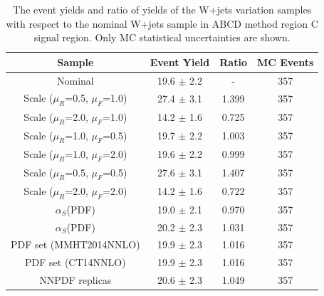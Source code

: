 \begin{table}[htbp!]
\begin{center}
\begin{tabular}{c|c|c||c}
Sample     & Event Yield & Ratio & MC Events \\ 
\hline
Nominal                              & 19.6 $\pm$ 2.2  & -      &  357 \\
Scale ($\mu_{R}$=0.5, $\mu_{F}$=1.0) & 27.4 $\pm$ 3.1  & 1.399  &  357 \\
Scale ($\mu_{R}$=2.0, $\mu_{F}$=1.0) & 14.2 $\pm$ 1.6  & 0.725  &  357 \\
Scale ($\mu_{R}$=1.0, $\mu_{F}$=0.5) & 19.7 $\pm$ 2.2  & 1.003  &  357 \\
Scale ($\mu_{R}$=1.0, $\mu_{F}$=2.0) & 19.6 $\pm$ 2.2  & 0.999  &  357 \\
Scale ($\mu_{R}$=0.5, $\mu_{F}$=0.5) & 27.6 $\pm$ 3.1  & 1.407  &  357 \\
Scale ($\mu_{R}$=2.0, $\mu_{F}$=2.0) & 14.2 $\pm$ 1.6  & 0.722  &  357 \\
$\alpha_{S}$(PDF)                    & 19.0 $\pm$ 2.1  & 0.970  &  357 \\
$\alpha_{S}$(PDF)                    & 20.2 $\pm$ 2.3  & 1.031  &  357 \\
PDF set (MMHT2014NNLO)               & 19.9 $\pm$ 2.3  & 1.016  &  357 \\
PDF set (CT14NNLO)                   & 19.9 $\pm$ 2.3  & 1.016  &  357 \\
NNPDF replicas                       & 20.6 $\pm$ 2.3  & 1.049  &  357 \\
\end{tabular}
\end{center}
\caption{The event yields and ratio of yields of the W+jets variation samples
with respect to the nominal W+jets sample in ABCD method region C signal region. 
Only MC statistical uncertainties are shown.} 
\label{tab:boosted_qcd_region_c_sr_systematics_wjets_yields}
\end{table}
%
%
